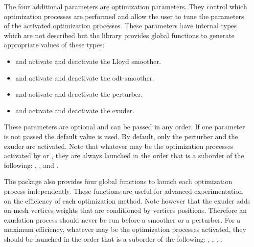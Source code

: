 The   four  additional parameters  are optimization parameters.
They control which optimization processes are performed
and allow the user  to tune the parameters of the activated  optimization processes.
These parameters have internal types which are not described
but the library provides  global functions  to generate
appropriate values of these types:
\begin{itemize}
\item {} and  activate and deactivate  the Lloyd smoother.
 \item {} and  activate and deactivate the odt-smoother.
\item {} and  activate and deactivate the perturber.
\item {} and  activate and deactivate the exuder.
\end{itemize}


These parameters are optional and can be passed in any order.
If one parameter is not passed the default value is used. By default,
only the perturber and the exuder are activated.
Note that whatever may be the optimization processes activated by 
or ,
they are always launched in the order that is a suborder 
of the following:
, ,  and 
. 

The package also provides four global functions to launch
each optimization process independently. These functions are useful for advanced experimentation 
on the efficiency of each optimization method.
Note however that the exuder adds on mesh vertices  weights that are conditioned by vertices
positions. 
Therefore an exudation process should never be run before
a smoother or a perturber. 
For a maximum efficiency, whatever  may be the optimization processes activated,
they should be launched in the order that is a suborder 
of the following:
, , ,
. 

{}
{}
{}


